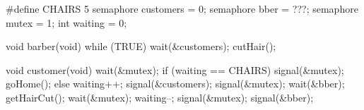 \documentclass[varwidth=28.2em,crop]{standalone}
\begin{document}
\begin{minipage}[t]{.42\linewidth}
\begin{ccode}
#define CHAIRS 5
semaphore customers = 0;
semaphore bber = ???; 
semaphore mutex = 1;
int waiting = 0;

void barber(void)
{
  while (TRUE) {
    wait(&customers);
    cutHair();
  }
}      
\end{ccode}
\end{minipage}\qquad
\begin{minipage}[t]{.48\linewidth}
\begin{ccode}
void customer(void)
{
  wait(&mutex);
  if (waiting == CHAIRS){
      signal(&mutex);
      goHome();
  } else {
      waiting++;
      signal(&customers);
      signal(&mutex);
      wait(&bber);
      getHairCut();
      wait(&mutex);
         waiting--;
      signal(&mutex);
      signal(&bber);
  }
}      
\end{ccode}
\end{minipage}
\end{document}
